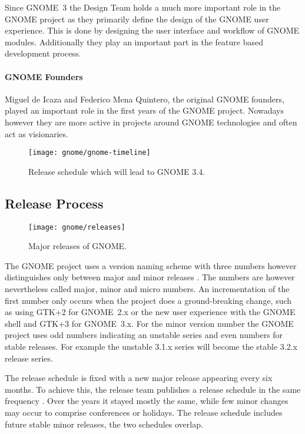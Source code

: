 Since GNOME~3 the Design Team holds a much more important role in the GNOME
project as they primarily define the design of the GNOME user experience. This
is done by designing the user interface and workflow of GNOME modules.
Additionally they play an important part in the feature based development
process.

\paragraph{GNOME Founders}

Miguel de Icaza and Federico Mena Quintero, the original GNOME founders, played
an important role in the first years of the GNOME project. Nowadays however
they are more active in projects around GNOME technologies and often act as
visionaries.

\begin{figure}[h!tbp]
  \centering
  \texttt{[image: gnome/gnome-timeline]}
  \caption{Release schedule which will lead to GNOME 3.4.}
\end{figure}


\subsection{Release Process} %

\begin{figure}[htbp]
  \centering
  \texttt{[image: gnome/releases]}
  \caption{Major releases of GNOME.}
\end{figure}

The GNOME project uses a version naming scheme with three numbers however
distinguishes only between major and minor releases
\cite{GNOMEDevelopmentSchedule,GNOMESchedule}. The numbers are however
nevertheless called major, minor and micro numbers. An incrementation of the
first number only occurs when the project does a ground-breaking change, such
as using GTK+2 for GNOME~2.x or the new user experience with the GNOME shell
and GTK+3 for GNOME~3.x. For the minor version number the GNOME project uses
odd numbers indicating an unstable series and even numbers for stable releases.
For example the unstable 3.1.x series will become the stable 3.2.x release
series.

The release schedule is fixed with a new major release appearing every six
months. To achieve this, the release team publishes a release schedule in the
same frequency \cite{GNOMEDevelopmentSchedule}. Over the years it stayed mostly
the same, while few minor changes may occur to comprise conferences or
holidays. The release schedule includes future stable minor releases, the two
schedules overlap.

